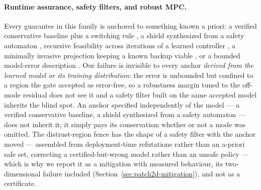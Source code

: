 \paragraph{Runtime assurance, safety filters, and robust MPC.} Every guarantee in this family is anchored to something known a priori: a verified conservative baseline plus a switching rule \citep{seto1998simplex,sha2001simplicity}, a shield synthesized from a safety automaton \citep{alshiekh2018shielding}, recursive feasibility across iterations of a learned controller \citep{rosolia2018lmpc,hewing2020learningmpc}, a minimally invasive projection keeping a known backup viable \citep{wabersich2021safetyfilter}, or a bounded model-error description \citep{rawlings2017mpc}. Our failure is invisible to every anchor \emph{derived from the learned model or its training distribution}: the error is unbounded but confined to a region the gate accepted as error-free, so a robustness margin tuned to the off-mode residual does not see it and a safety filter built on the same accepted model inherits the blind spot. An anchor specified independently of the model --- a verified conservative baseline, a shield synthesized from a safety automaton --- does not inherit it; it simply pays its conservatism whether or not a mode was omitted. The distrust-region fence has the shape of a safety filter with the anchor moved --- assembled from deployment-time refutations rather than an a-priori safe set, correcting a certified-but-wrong model rather than an unsafe policy --- which is why we report it as a mitigation with measured behaviour, its two-dimensional failure included (Section~\ref{sec:patch2d-mitigation}), and not as a certificate.

